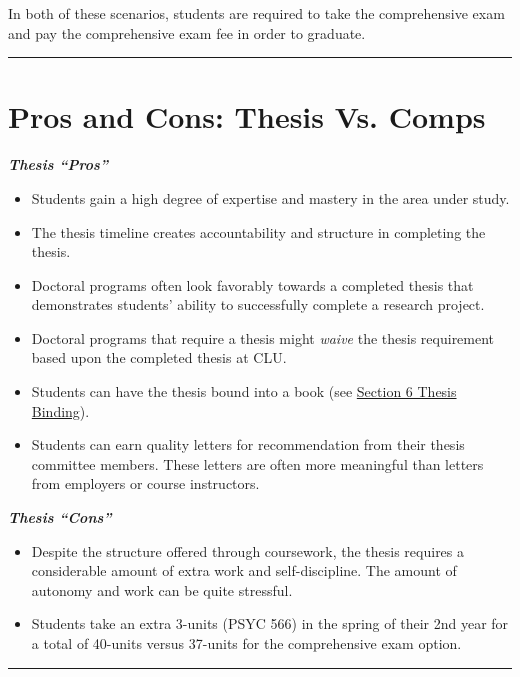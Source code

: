 \documentclass[openany]{book}
\providecommand{\tightlist}{%
  \setlength{\itemsep}{0pt}\setlength{\parskip}{0pt}}
\begin{document}
In both of these scenarios, students are required to take the comprehensive exam and pay the comprehensive exam fee in order to graduate.

\begin{center}\rule{0.5\linewidth}{0.5pt}\end{center}

\hypertarget{pros-and-cons-thesis-vs.-comps}{%
\section{Pros and Cons: Thesis Vs. Comps}\label{pros-and-cons-thesis-vs.-comps}}

\textbf{\emph{Thesis ``Pros''}}

\begin{itemize}
\tightlist
\item
  Students gain a high degree of expertise and mastery in the area under study.
\item
  The thesis timeline creates accountability and structure in completing the thesis.
\item
  Doctoral programs often look favorably towards a completed thesis that demonstrates students' ability to successfully complete a research project.
\item
  Doctoral programs that require a thesis might \emph{waive} the thesis requirement based upon the completed thesis at CLU.
\item
  Students can have the thesis bound into a book (see \protect\hyperlink{binding}{Section 6 Thesis Binding}).
\item
  Students can earn quality letters for recommendation from their thesis committee members. These letters are often more meaningful than letters from employers or course instructors.
\end{itemize}

\textbf{\emph{Thesis ``Cons''}}

\begin{itemize}
\tightlist
\item
  Despite the structure offered through coursework, the thesis requires a considerable amount of extra work and self-discipline. The amount of autonomy and work can be quite stressful.
\item
  Students take an extra 3-units (PSYC 566) in the spring of their 2nd year for a total of 40-units versus 37-units for the comprehensive exam option.
\end{itemize}

\begin{center}\rule{0.5\linewidth}{0.5pt}\end{center}
\end{document}
